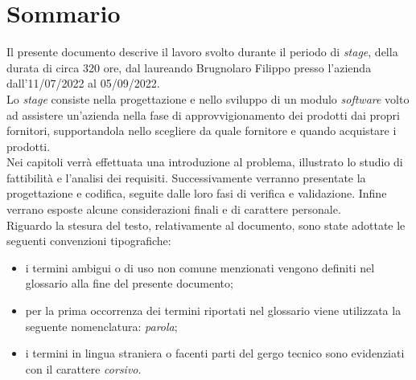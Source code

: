 
\cleardoublepage
{}
{}
\begingroup
\let\clearpage\relax
\let\cleardoublepage\relax
\let\cleardoublepage\relax

\chapter*{Sommario}

\noindent Il presente documento descrive il
lavoro svolto durante il periodo di \textit{stage},
della durata di circa 320 ore, dal laureando
Brugnolaro Filippo presso l'azienda
\textit{\myCompany} dall'11/07/2022 al
05/09/2022.\\
\noindent Lo \textit{stage} consiste nella progettazione e nello sviluppo di un modulo \textit{software} volto
ad assistere un'azienda nella fase di approvvigionamento dei prodotti dai propri fornitori, supportandola nello scegliere
da quale fornitore e quando acquistare i prodotti.\\
Nei capitoli verrà effettuata una introduzione al problema, illustrato lo studio di fattibilità e l'analisi dei requisiti.
Successivamente verranno presentate la progettazione e codifica, seguite dalle loro fasi di verifica e validazione.
Infine verrano esposte alcune considerazioni finali e di carattere personale.\\

\noindent Riguardo la stesura del testo, relativamente al documento, sono state adottate le seguenti convenzioni tipografiche:
\begin{itemize}
	\item i termini ambigui o di uso non comune menzionati vengono definiti nel glossario alla fine del presente documento;
	\item per la prima occorrenza dei termini riportati nel glossario viene utilizzata la seguente nomenclatura: \emph{parola}\glsfirstoccur;
	\item i termini in lingua straniera o facenti parti del gergo tecnico sono evidenziati con il carattere \emph{corsivo}.
\end{itemize}

%
%

\endgroup			

\vfill

